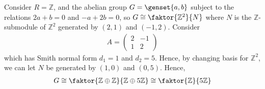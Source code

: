\begin{example}
	Consider $R = \mathbb Z$, and the abelian group $G = \genset{a,b}$ subject to the relations $2a + b = 0$ and $-a + 2b = 0$, so $G \cong \faktor{\mathbb Z^2}{N}$ where $N$ is the $\mathbb Z$-submodule of $\mathbb Z^2$ generated by $(2,1)$ and $(-1,2)$.
	Consider
	\begin{align*}
		A = \begin{pmatrix}
			2 & -1 \\
			1 & 2
		\end{pmatrix}
	\end{align*}
	which has Smith normal form $d_1 = 1$ and $d_2 = 5$.
	Hence, by changing basis for $\mathbb Z^2$, we can let $N$ be generated by $(1,0)$ and $(0,5)$.
	Hence,
	\begin{align*}
		G \cong \faktor{\mathbb Z \oplus \mathbb Z}{\mathbb Z \oplus 5 \mathbb Z} \cong \faktor{\mathbb Z}{5\mathbb Z}
	\end{align*}
\end{example}

